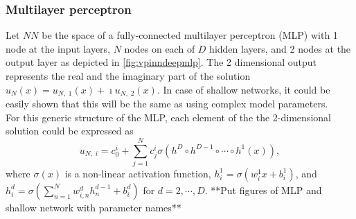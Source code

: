 \subsubsection{Multilayer perceptron}\label{sec:vpinnsmlp}
Let $NN$ be the space of a fully-connected multilayer perceptron (MLP) with 1 node at the input layers,
$N$ nodes on each of $D$ hidden layers, and 2 nodes at the output layer as depicted in \autoref{fig:vpinndeepmlp}.
The 2 dimensional output represents the real and the imaginary part of the solution
$u_N(x) = u_{N,\;1}(x) + \imath u_{N,\;2}(x)$. In case of shallow networks, it could be easily shown that this will
be the same as using complex model parameters.\\
For this generic structure of the MLP, each element of the the 2-dimensional solution could be expressed as
\begin{equation}
    \label{eq:vpinngeneric}
    u_{N,\;i} = c_0^i + \sum_{j=1}^{N}{c_j^i \sigma(h^{D} \circ h^{D-1} \circ \cdots \circ h^1(x))},
\end{equation}
where $\sigma (x)$ is a non-linear activation function, $h^1_i = \sigma(w^1_i x + b^1_i)$, and
$h^d_i = \sigma(\sum_{n=1}^{N}{w^d_{i, n} h^{d-1}_n} + b^d_i)$ for $d = 2, \cdots, D$.
**Put figures of MLP and shallow network with parameter names**
